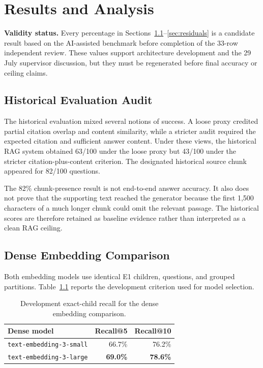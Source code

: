 \chapter{Results and Analysis}
\label{chap:results}

\begin{draftbox}
\small\textbf{Validity status.}
Every percentage in Sections~\ref{sec:historical-audit}--\ref{sec:residuals} is a candidate result based on the AI-assisted benchmark before completion of the 33-row independent review. These values support architecture development and the 29 July supervisor discussion, but they must be regenerated before final accuracy or ceiling claims.
\end{draftbox}

\section{Historical Evaluation Audit}
\label{sec:historical-audit}

The historical evaluation mixed several notions of success. A loose proxy credited partial citation overlap and content similarity, while a stricter audit required the expected citation and sufficient answer content. Under these views, the historical RAG system obtained 63/100 under the loose proxy but 43/100 under the stricter citation-plus-content criterion. The designated historical source chunk appeared for 82/100 questions.

The 82\% chunk-presence result is not end-to-end answer accuracy. It also does not prove that the supporting text reached the generator because the first 1,500 characters of a much longer chunk could omit the relevant passage. The historical scores are therefore retained as baseline evidence rather than interpreted as a clean RAG ceiling.

\section{Dense Embedding Comparison}

Both embedding models use identical E1 children, questions, and grouped partitions. Table~\ref{tab:dense-dev} reports the development criterion used for model selection.

\begin{table}[htbp]
  \centering
  \caption{Development exact-child recall for the dense embedding comparison.}
  \label{tab:dense-dev}
  \begin{tabular}{lrr}
    \toprule
    \textbf{Dense model} & \textbf{Recall@5} & \textbf{Recall@10} \\
    \midrule
    \texttt{text-embedding-3-small} & 66.7\% & 76.2\% \\
    \texttt{text-embedding-3-large} & \textbf{69.0\%} & \textbf{78.6\%} \\
    \bottomrule
  \end{tabular}
\end{table}


